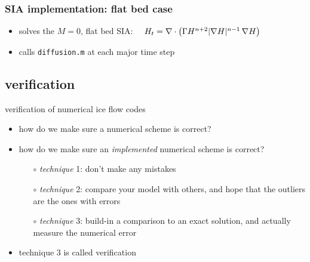 \begin{frame}
  \frametitle{SIA implementation: flat bed case}


\vspace{-3mm}
\small
\begin{itemize}
\item solves the $M=0$, flat bed SIA: $\quad H_t = \nabla\cdot \left(\Gamma H^{n+2} |\nabla H|^{n-1}\, \nabla H \right)$
\item calls \texttt{diffusion.m} at each major time step
\end{itemize}
\end{frame}


\subsection{verification}

\begin{frame}{verification of numerical ice flow codes}
\begin{itemize}
\item how do we make sure a numerical scheme is correct?

\vspace{5mm}
\item how do we make sure an \emph{implemented} numerical scheme is correct?
  \begin{itemize}
  \item[$\circ$] \emph{technique} 1: don't make any mistakes
  \item[$\circ$] \emph{technique} 2: compare your model with others, and hope that the outliers are the ones with errors
  \item[$\circ$] \emph{technique} 3: build-in a comparison to an exact solution, and actually measure the numerical error
  \end{itemize}

\vspace{5mm}
\item technique 3 is called \alert{verification}
\end{itemize}
\end{frame}


